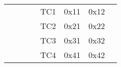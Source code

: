 \begin{landscape}
\begin{longtable}[c]{|l|l|l|l|l|l|l|l|l|}
		&                                         &                                                                                                 &                                    & TC1                                                                                   & 0x11                                                                                                             & \multicolumn{2}{l|}{0x12}                                                                                                     &                                                                                                                                                                                                                                           \\ \cline{5-8}
		&                                         &                                                                                                 &                                    & TC2                                                                                   & 0x21                                                                                                             & \multicolumn{2}{l|}{0x22}                                                                                                     &                                                                                                                                                                                                                                           \\ \cline{5-8}
		&                                         &                                                                                                 &                                    & TC3                                                                                   & 0x31                                                                                                             & \multicolumn{2}{l|}{0x32}                                                                                                     &                                                                                                                                                                                                                                           \\ \cline{5-8}
		&                                         &                                                                                                 &                                    & TC4                                                                                   & 0x41                                                                                                             & \multicolumn{2}{l|}{0x42}                                                                                                     &                                                                                                                                                                                                                                           \\ \cline{5-8}

\end{longtable}
\end{landscape}

